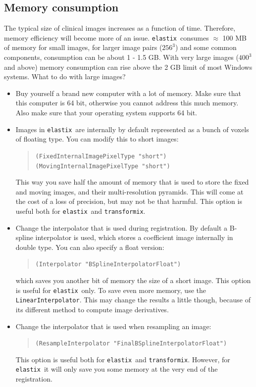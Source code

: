 \documentclass[]{report}
\newcommand{\elastix}{\texttt{elastix}}
\newcommand{\transformix}{\texttt{transformix}}
\begin{document}
\subsection{Memory consumption}\label{ssec:tut:memory}

The typical size of clinical images increases as a function of time.
Therefore, memory efficiency will become more of an issue. \elastix\
consumes $\approx$ 100 MB of memory for small images, for larger
image pairs ($256^3$) and some common components, consumption can be
about 1 - 1.5 GB. With very large images ($400^3$ and above) memory
consumption can rise above the 2 GB limit of most Windows systems.
What to do with large images?
\begin{itemize}
\item Buy yourself a brand new computer with a lot of memory. Make
sure that this computer is 64 bit, otherwise you cannot address this
much memory. Also make sure that your operating system supports 64
bit.

\item Images in \elastix\ are internally by default represented as a bunch of
voxels of floating type. You can modify this to short images:
\begin{quote}
\texttt{(FixedInternalImagePixelType "short")} \\
\texttt{(MovingInternalImagePixelType "short")}
\end{quote}
This way you save half the amount of memory that is used to store the
fixed and moving images, and their multi-resolution pyramids. This
will come at the cost of a loss of precision, but may not be that
harmful. This option is useful both for \elastix\ and \transformix.

\item Change the interpolator that is used during registration. By default a B-spline
interpolator is used, which stores a coefficient image internally in
double type. You can also specify a float version:
\begin{quote}
\texttt{(Interpolator "BSplineInterpolatorFloat")}
\end{quote}
which saves you another bit of memory the size of a short image.
This option is useful for \elastix\ only. To save even more
memory, use the \texttt{LinearInterpolator}. This may change the
results a little though, because of its different method to
compute image derivatives.

\item Change the interpolator that is used when resampling an image:
\begin{quote}
\texttt{(ResampleInterpolator "FinalBSplineInterpolatorFloat")}
\end{quote}
This option is useful both for \elastix\ and \transformix. However,
for \elastix\ it will only save you some memory at the very end of
the registration.


\end{itemize}
\end{document}
